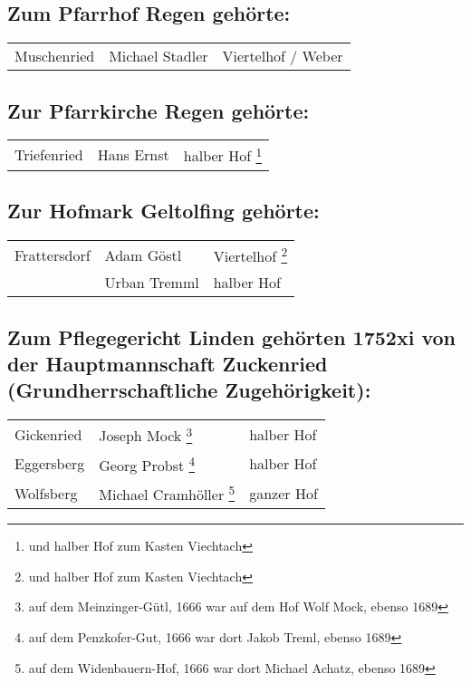 \documentclass[12pt,a4pager]{book}
\begin{document}
\subsection{Zum Pfarrhof Regen gehörte:}

\begin{longtable}{l|l|l}
Muschenried & Michael Stadler & Viertelhof / Weber\\
\end{longtable}

\subsection{Zur Pfarrkirche Regen gehörte:}

\begin{longtable}{l|l|l}
Triefenried & Hans Ernst & halber Hof \footnote{und halber Hof zum Kasten
Viechtach}\\
\end{longtable}

\subsection{Zur Hofmark Geltolfing gehörte:}

\begin{longtable}{l|l|l}
Frattersdorf & Adam Göstl & Viertelhof \footnote{und halber Hof zum Kasten
Viechtach}\\

& Urban Tremml & halber Hof\\
\end{longtable}

\subsection{Zum Pflegegericht Linden gehörten 1752xi von der Hauptmannschaft
Zuckenried (Grundherrschaftliche Zugehörigkeit):}

\begin{longtable}{l|l|l}
Gickenried & Joseph Mock \footnote{auf dem Meinzinger-Gütl, 1666 war auf dem Hof
Wolf Mock, ebenso 1689} & halber Hof\\

Eggersberg & Georg Probst \footnote{auf dem Penzkofer-Gut, 1666 war dort Jakob
Treml, ebenso 1689} & halber Hof\\

Wolfsberg & Michael Cramhöller \footnote{auf dem Widenbauern-Hof, 1666 war dort
Michael Achatz, ebenso 1689} & ganzer Hof\\
\end{longtable}
\end{document}
